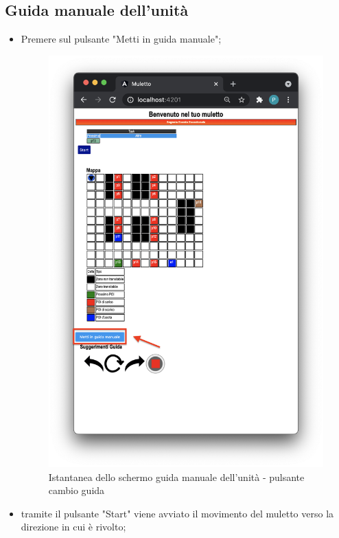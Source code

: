 \subsection{Guida manuale dell'unità}
\begin{itemize}
    \item Premere sul pulsante "Metti in guida manuale";
    \begin{figure}[H]
        \centering
          \includegraphics[scale=0.45]{res/images/forklift_guidamanuale.png}
          \caption{Istantanea dello schermo guida manuale dell'unità - pulsante cambio guida}
    \end{figure}
    \item tramite il pulsante "Start" viene avviato il movimento del muletto verso la direzione in cui è rivolto;
    \begin{figure}[H]

\end{figure}
\end{itemize}

